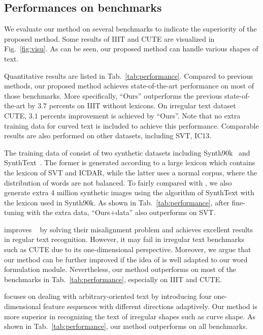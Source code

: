 \documentclass[letterpaper]{article} \usepackage{aaai19}  \usepackage{times}  \usepackage{helvet}  \usepackage{courier}  \usepackage{url}  \usepackage{graphicx}  \frenchspacing  \usepackage{multirow}
\begin{document}
\subsection{Performances on benchmarks}
We evaluate our method on several benchmarks to indicate the superiority of the proposed method. Some results of IIIT and CUTE are visualized in Fig.~\ref{fig:visu}. As can be seen, our proposed method can handle various shapes of text. 

Quantitative results are listed in Tab.~\ref{tab:performance}. Compared to previous methods, our proposed method achieves state-of-the-art performance on most of those benchmarks. More specifically, ``Ours'' outperforms the previous state-of-the-art by $3.7$ percents on IIIT without lexicons. On irregular text dataset CUTE, $3.1$ percents improvement is achieved by ``Ours''. Note that no extra training data for curved text is included to achieve this performance. Comparable results are also performed on other datasets, including SVT, IC13. 

The training data of \cite{ChengBXZPZ17} consist of two synthetic datasets including Synth90k~\cite{synth90} and SynthText~\cite{gupta2016synthetic}. The former is generated according to a large lexicon which contains the lexicon of SVT and ICDAR, while the latter uses a normal corpus, where the distribution of words are not balanced. To fairly compared with \cite{ChengBXZPZ17}, we also generate extra 4 million synthetic images using the algorithm of SynthText with the lexicon used in Synth90k. As shown in Tab.~\ref{tab:performance}, after fine-tuning with the extra data, ``Ours+data'' also outperforms \cite{ChengBXZPZ17} on SVT.

\cite{bai2018edit} improves ~\cite{ChengBXZPZ17,DBLP:conf/cvpr/ShiWLYB16} by solving their misalignment problem and achieves excellent results in regular text recognition. However, it may fail in irregular text benchmarks such as CUTE due to its one-dimensional perspective. Moreover, we argue that our method can be further improved if the idea of \cite{bai2018edit} is well adapted to our word formulation module. Nevertheless, our method outperforms \cite{bai2018edit} on most of the benchmarks in Tab.~\ref{tab:performance}, especially on IIIT and CUTE. 

\cite{cheng2018aon} focuses on dealing with arbitrary-oriented text by introducing four one-dimensional feature sequences with different directions adaptively. Our method is more superior in recognizing the text of irregular shapes such as curve shape. As shown in Tab.~\ref{tab:performance}, our method outperforms \cite{cheng2018aon} on all benchmarks.
\end{document}
